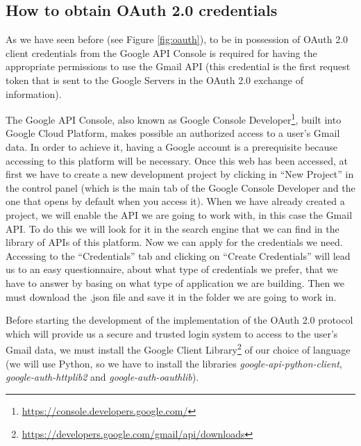 \subsection{How to obtain OAuth 2.0 credentials}\label{ssect:oauth}
As we have seen before (see Figure \ref{fig:oauth}), to be in possession of OAuth 2.0 client credentials from the Google API Console is required for having the appropriate permissions to use the Gmail API (this credential is the first request token that is sent to the Google Servers in the OAuth 2.0 exchange of information).

The Google API Console, also known as Google Console Developer\footnote{\url{https://console.developers.google.com/}}, built into Google Cloud Platform, makes possible an authorized access to a user's Gmail data. In order to achieve it, having a Google account is a prerequisite because accessing to this platform will be necessary. Once this web has been accessed, at first we have to create a new development project by clicking in ``New Project'' in the control panel (which is the main tab of the Google Console Developer and the one that opens by default when you access it). When we have already created a project, we will enable the API we are going to work with, in this case the Gmail API. To do this we will look for it in the search engine that we can find in the library of APIs of this platform. Now we can apply for the credentials we need. Accessing to the ``Credentials'' tab and clicking on ``Create Credentials'' will lead us to an easy questionnaire, about what type of credentials we prefer, that we have to answer by basing on what type of application we are building. Then we must download the .json file and save it in the folder we are going to work in.

Before starting the development of the implementation of the OAuth 2.0 protocol which will provide us a secure and trusted login system to access to the user's Gmail data, we must install the Google Client Library\footnote{\url{https://developers.google.com/gmail/api/downloads}} of our choice of language (we will use Python, so we have to install the libraries \textit{google-api-python-client}, \textit{google-auth-httplib2} and \textit{google-auth-oauthlib}).

